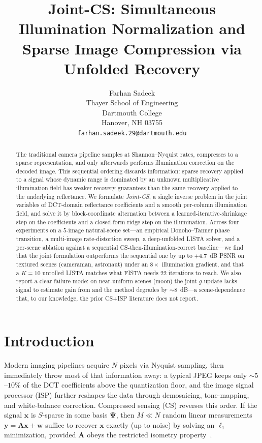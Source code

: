 \documentclass{article}
\title{Joint-CS: Simultaneous Illumination Normalization and\\ Sparse Image Compression via Unfolded Recovery}
\author{%
  Farhan Sadeek \\
  Thayer School of Engineering\\
  Dartmouth College\\
  Hanover, NH 03755 \\
  \texttt{farhan.sadeek.29@dartmouth.edu} \\
}
\begin{document}
\maketitle


\begin{abstract}
The traditional camera pipeline samples at Shannon--Nyquist rates, compresses to a sparse representation, and only afterwards performs illumination correction on the decoded image. This sequential ordering discards information: sparse recovery applied to a signal whose dynamic range is dominated by an unknown multiplicative illumination field has weaker recovery guarantees than the same recovery applied to the underlying reflectance. We formulate \emph{Joint-CS}, a single inverse problem in the joint variables of DCT-domain reflectance coefficients and a smooth per-column illumination field, and solve it by block-coordinate alternation between a learned-iterative-shrinkage step on the coefficients and a closed-form ridge step on the illumination. Across four experiments on a $5$-image natural-scene set---an empirical Donoho--Tanner phase transition, a multi-image rate-distortion sweep, a deep-unfolded LISTA solver, and a per-scene ablation against a sequential CS-then-illumination-correct baseline---we find that the joint formulation outperforms the sequential one by up to $+4.7$~dB PSNR on textured scenes (cameraman, astronaut) under an $8\times$ illumination gradient, and that a $K{=}10$ unrolled LISTA matches what FISTA needs $22$ iterations to reach. We also report a clear failure mode: on near-uniform scenes (moon) the joint $g$-update lacks signal to estimate gain from and the method degrades by $\sim 8$~dB---a scene-dependence that, to our knowledge, the prior CS+ISP literature does not report.
\end{abstract}


\section{Introduction}
\label{sec:intro}

Modern imaging pipelines acquire $N$ pixels via Nyquist sampling, then immediately throw most of that information away: a typical JPEG keeps only $\sim 5$--$10\%$ of the DCT coefficients above the quantization floor, and the image signal processor (ISP) further reshapes the data through demosaicing, tone-mapping, and white-balance correction. Compressed sensing (CS) reverses this order. If the signal $\boldsymbol{x}$ is $S$-sparse in some basis $\boldsymbol{\Psi}$, then $M \ll N$ random linear measurements $\boldsymbol{y} = \boldsymbol{A}\boldsymbol{x} + \boldsymbol{w}$ suffice to recover $\boldsymbol{x}$ exactly (up to noise) by solving an $\ell_1$ minimization, provided $\boldsymbol{A}$ obeys the restricted isometry property~\citep{candes2006stable,donoho2006compressed}.
\end{document}
